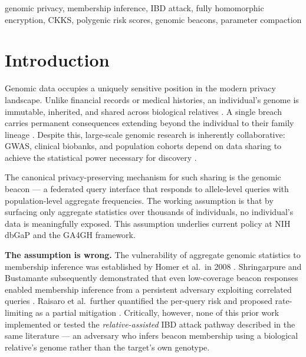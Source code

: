 \documentclass[conference]{IEEEtran}
\begin{document}
\begin{IEEEkeywords}
genomic privacy, membership inference, IBD attack, fully homomorphic
encryption, CKKS, polygenic risk scores, genomic beacons, parameter compaction
\end{IEEEkeywords}

\section{Introduction}

Genomic data occupies a uniquely sensitive position in the modern privacy
landscape. Unlike financial records or medical histories, an individual's
genome is immutable, inherited, and shared across biological relatives
\cite{erlich2014}. A single breach carries permanent consequences extending
beyond the individual to their family lineage \cite{gursoy2022functional}.
Despite this, large-scale genomic research is inherently collaborative: GWAS,
clinical biobanks, and population cohorts depend on data sharing to achieve
the statistical power necessary for discovery \cite{balaji2015,stark2025}.

The canonical privacy-preserving mechanism for such sharing is the genomic
beacon --- a federated query interface that responds to allele-level queries
with population-level aggregate frequencies. The working assumption is that
by surfacing only aggregate statistics over thousands of individuals, no
individual's data is meaningfully exposed. This assumption underlies current
policy at NIH dbGaP and the GA4GH framework.

\textbf{The assumption is wrong.} The vulnerability of aggregate genomic
statistics to membership inference was established by Homer et al.\ in 2008
\cite{homer2008}. Shringarpure and Bustamante subsequently demonstrated that
even low-coverage beacon responses enabled membership inference from a
persistent adversary exploiting correlated queries \cite{shringarpure2015}.
Raisaro et al.\ further quantified the per-query risk and proposed
rate-limiting as a partial mitigation \cite{raisaro2017}. Critically, however,
none of this prior work implemented or tested the \emph{relative-assisted}
IBD attack pathway described in the same literature \cite{gymrek2013,erlich2014}
--- an adversary who infers beacon membership using a biological relative's
genome rather than the target's own genotype.
\end{document}
